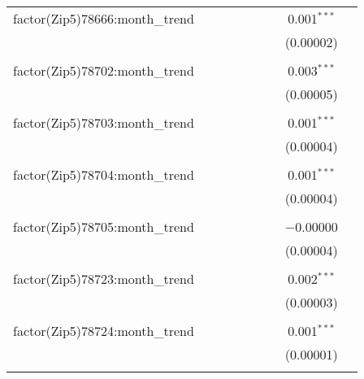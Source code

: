 \begin{table}[H]
{\begin{tabular}{@{\extracolsep{5pt}}lcccccccc}
  factor(Zip5)78666:month\_trend &  &  &  &  &  &  & 0.001$^{***}$ &  \\  

   &  &  &  &  &  &  & (0.00002) &  \\  

   & & & & & & & & \\  

  factor(Zip5)78702:month\_trend &  &  &  &  &  &  & 0.003$^{***}$ &  \\  

   &  &  &  &  &  &  & (0.00005) &  \\  

   & & & & & & & & \\  

  factor(Zip5)78703:month\_trend &  &  &  &  &  &  & 0.001$^{***}$ &  \\  

   &  &  &  &  &  &  & (0.00004) &  \\  

   & & & & & & & & \\  

  factor(Zip5)78704:month\_trend &  &  &  &  &  &  & 0.001$^{***}$ &  \\  

   &  &  &  &  &  &  & (0.00004) &  \\  

   & & & & & & & & \\  

  factor(Zip5)78705:month\_trend &  &  &  &  &  &  & $-$0.00000 &  \\  

   &  &  &  &  &  &  & (0.00004) &  \\  

   & & & & & & & & \\  

  factor(Zip5)78723:month\_trend &  &  &  &  &  &  & 0.002$^{***}$ &  \\  

   &  &  &  &  &  &  & (0.00003) &  \\  

   & & & & & & & & \\  

  factor(Zip5)78724:month\_trend &  &  &  &  &  &  & 0.001$^{***}$ &  \\  

   &  &  &  &  &  &  & (0.00001) &  \\  

   & & & & & & & & \\  


\end{tabular}}
\end{table}
